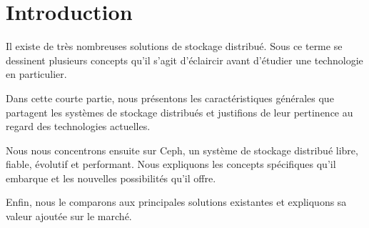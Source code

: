 \chapter{Introduction}

Il existe de très nombreuses solutions de stockage distribué. Sous ce terme se dessinent plusieurs concepts qu'il s'agit d'éclaircir avant d'étudier une technologie en particulier. 

Dans cette courte partie, nous présentons les caractéristiques générales que partagent les systèmes de stockage distribués et justifions de leur pertinence au regard des technologies actuelles.

Nous nous concentrons ensuite sur Ceph, un système de stockage distribué libre, fiable, évolutif et performant. Nous expliquons les concepts spécifiques qu'il embarque et les nouvelles possibilités qu'il offre.

Enfin, nous le comparons aux principales solutions existantes et expliquons sa valeur ajoutée sur le marché.



